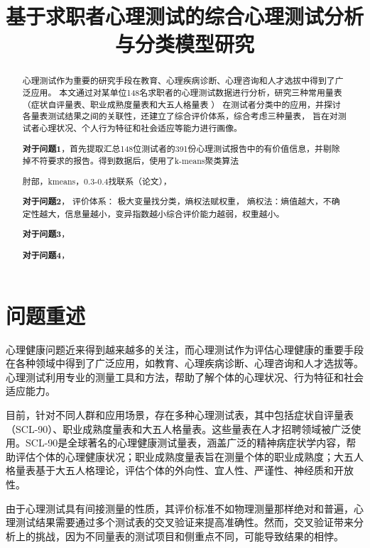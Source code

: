 \documentclass[withoutpreface,bwprint]{cumcmthesis} %
\title{基于求职者心理测试的综合心理测试分析与分类模型研究}
\begin{document}
 \maketitle
 \begin{abstract}
    心理测试作为重要的研究手段在教育、心理疾病诊断、心理咨询和人才选拔中得到了广泛应用。
    本文通过对某单位148名求职者的心理测试数据进行分析，研究三种常用量表（症状自评量表、职业成熟度量表和大五人格量表 ）
    在测试者分类中的应用，并探讨各量表测试结果之间的关联性，还建立了综合评价体系，综合考虑三种量表，
    旨在对测试者心理状况、个人行为特征和社会适应等能力进行画像。

    \textbf{对于问题1}，首先提取汇总148位测试者的391份心理测试报告中的有价值信息，并剔除掉不符要求的报告。得到数据后，使用了k-means聚类算法
    

    肘部，kmeans，0.3-0.4找联系（论文），   



    \textbf{对于问题2}，
    评价体系：
    极大变量找分类，熵权法赋权重，
    熵权法：熵值越大，不确定性越大，信息量越小，变异指数越小综合评价能力越弱，权重越小。
    
    \textbf{对于问题3}，

    
    \textbf{对于问题4}，

\end{abstract}



\section{问题重述}

心理健康问题近来得到越来越多的关注，而心理测试作为评估心理健康的重要手段在各种领域中得到了广泛应用，如教育、心理疾病诊断、心理咨询和人才选拔等。心理测试利用专业的测量工具和方法，帮助了解个体的心理状况、行为特征和社会适应能力。

目前，针对不同人群和应用场景，存在多种心理测试表，其中包括症状自评量表（SCL-90）、职业成熟度量表和大五人格量表。这些量表在人才招聘领域被广泛使用。SCL-90是全球著名的心理健康测试量表，涵盖广泛的精神病症状学内容，帮助评估个体的心理健康状况；职业成熟度量表旨在测量个体的职业成熟度；大五人格量表基于大五人格理论，评估个体的外向性、宜人性、严谨性、神经质和开放性。

由于心理测试具有间接测量的性质，其评价标准不如物理测量那样绝对和普遍，心理测试结果需要通过多个测试表的交叉验证来提高准确性。然而，交叉验证带来分析上的挑战，因为不同量表的测试项目和侧重点不同，可能导致结果的相悖。
\end{document}
